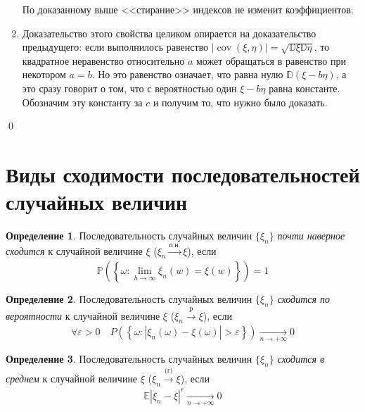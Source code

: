 \documentclass[oneside,final,14pt]{extreport}
\renewenvironment{proof}{{\bfseries Доказательство.}}{\qed}
\theoremstyle{plain}
\theoremstyle{definition}
\newtheorem*{defn}{Определение}
\theoremstyle{named}
\begin{document}
\begin{proof}
\begin{enumerate}
    По доказанному выше <<стирание>> индексов не изменит коэффициентов.

    \item Доказательство этого свойства целиком опирается на доказательство предыдущего: если выполнилось равенство $|\operatorname{cov}(\xi, \eta)|=\sqrt{\mathbb{D} \xi \mathbb{D} \eta}$, то квадратное неравенство относительно $a$ может обращаться в равенство при некотором $a = b$. Но это равенство означает, что равна нулю $\mathbb{D}(\xi-b \eta)$, а это сразу говорит о том, что с вероятностью один $\xi - b\eta$ равна константе. Обозначим эту константу за $c$ и получим то, что нужно было доказать.

\end{enumerate}
\end{proof}

\section{Виды сходимости последовательностей случайных величин}
\begin{defn}
    Последовательность случайных величин $\{\xi_n\}$ {\it почти наверное сходится} к случайной величине $\xi$ ($\xi_n \xrightarrow[]{\text{п.н.}} \xi$), если
    \begin{equation*}
        \mathbb{P}\left(\left\{\omega \colon \lim\limits _{h \rightarrow \infty} \xi_{n}(w)=\xi(w)\right\}\right)=1
    \end{equation*}
\end{defn}

\begin{defn}
    Последовательность случайных величин $\{\xi_n\}$ {\it сходится по вероятности} к случайной величине $\xi$ ($\xi_n \xrightarrow[]{\text{p}} \xi$), если
    \begin{equation*}
        \forall \varepsilon>0 \quad P\left(\left\{\omega \colon |\xi_{n}(\omega)-\xi(\omega)|>\varepsilon\right\}\right) \xrightarrow[n \to +\infty]{} 0
    \end{equation*}
\end{defn}

\begin{defn}
    Последовательность случайных величин $\{\xi_n\}$ {\it сходится в среднем} к случайной величине $\xi$ ($\xi_n \xrightarrow[]{\text{(r)}} \xi$), если
    \begin{equation*}
        \mathbb{E}\left|\xi_{n}-\xi\right|^{r} \xrightarrow[n \to +\infty]{} 0
    \end{equation*}
\end{defn}
\end{document}
